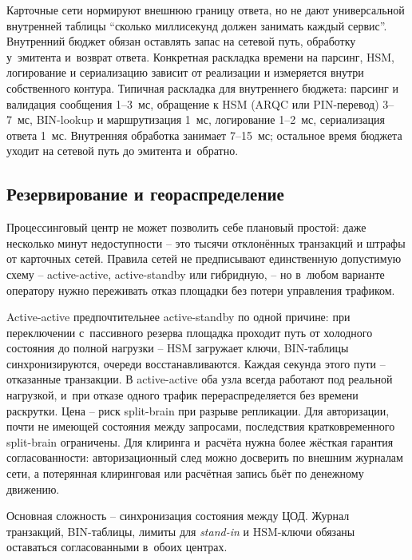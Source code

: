 Карточные сети нормируют внешнюю границу ответа, но не дают
универсальной внутренней таблицы \enquote{сколько миллисекунд
должен занимать каждый сервис}. Внутренний бюджет обязан
оставлять запас на сетевой путь, обработку у~эмитента
и~возврат ответа. Конкретная раскладка времени на парсинг,
HSM, логирование и сериализацию зависит от реализации
и измеряется внутри собственного контура. Типичная раскладка
для внутреннего бюджета: парсинг и валидация сообщения
1--3~мс, обращение к HSM (ARQC или PIN-перевод) 3--7~мс,
BIN-lookup и маршрутизация 1~мс, логирование 1--2~мс,
сериализация ответа 1~мс. Внутренняя обработка занимает 7--15~мс;
остальное время бюджета уходит на сетевой путь до эмитента и~обратно.

\subsection*{Резервирование и геораспределение}

Процессинговый центр не может позволить себе плановый простой:
даже несколько минут недоступности -- это тысячи отклонённых
транзакций и штрафы от карточных сетей. Правила сетей не
предписывают единственную допустимую схему -- active-active,
active-standby или гибридную, -- но в~любом варианте оператору
нужно переживать отказ площадки без потери управления трафиком.

Active-active предпочтительнее active-standby по одной причине:
при переключении с~пассивного резерва площадка проходит путь
от холодного состояния до полной нагрузки -- HSM загружает ключи,
BIN-таблицы синхронизируются, очереди восстанавливаются. Каждая
секунда этого пути -- отказанные транзакции. В active-active оба
узла всегда работают под реальной нагрузкой, и~при отказе одного
трафик перераспределяется без времени раскрутки. Цена -- риск
split-brain при разрыве репликации. Для авторизации, почти не
имеющей состояния между запросами, последствия кратковременного
split-brain ограничены. Для клиринга и~расчёта нужна более жёсткая
гарантия согласованности: авторизационный след можно досверить
по внешним журналам сети, а потерянная клиринговая или расчётная
запись бьёт по денежному движению.

Основная сложность -- синхронизация состояния между ЦОД.
Журнал транзакций, BIN-таблицы, лимиты для \textit{stand-in} и HSM-ключи
обязаны оставаться согласованными в~обоих центрах.

